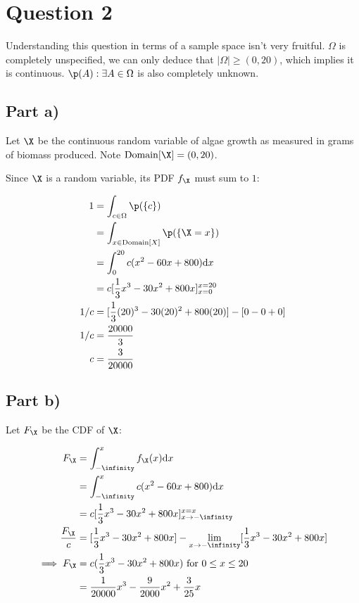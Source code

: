 \vspace{0.5cm}

\section{Question 2}

Understanding this question in terms of a sample space isn't very fruitful.
$\Omega$ is completely unspecified, we can only deduce that $|\Omega| \geq (0, 20)$, which implies it is continuous.
$\p (A) : \exists A \in \Omega$ is also completely unknown.

\subsection{Part a)}

Let $\X$ be the continuous random variable of algae growth as measured in grams of biomass produced.
Note $\mathrm{Domain}[\X] = (0, 20)$.

Since $\X$ is a random variable, its PDF $f_{\X}$ must sum to $1$:

\begin{align}
1 &= \int _{c \in \Omega} \p (\{ c \}) \\
&= \int _{x \in \mathrm{Domain}[X]} \p(\{ \X = x \}) \\
&= \int _0 ^{20} c(x^2 - 60x + 800) \mathrm{d}x \\
&= c[\frac{1}{3}x^3 - 30x^2 + 800x]_{x = 0}^{x=20} \\
1/c &= [\frac{1}{3}(20)^3 - 30(20)^2 + 800(20)] - [0 - 0 + 0] \\
1/c &= \frac{20000}{3} \\
c &= \frac{3}{20000}
\end{align}

\subsection{Part b)}

Let $F_{\X}$ be the CDF of $\X$:

\begin{align}
F_{\X} &= \int _{-\infinity} ^{x} f_{\X}(x) \mathrm{d}x \\
&= \int _{-\infinity} ^{x} c(x^2 - 60x + 800) \mathrm{d}x \\
&= c [\frac{1}{3}x^3 - 30x^2 + 800x]_{x \to -\infinity}^{x = x} \\
\frac{F_{\X}}{c} &= [\frac{1}{3} x^3 - 30x^2 + 800x] - \lim_{x \to -\infinity} [\frac{1}{3} x^3 - 30x^2 + 800x] \\
\implies F_{\X} &= c(\frac{1}{3} x^3 - 30x^2 + 800x) \text{ for } 0 \leq x \leq 20 \\
&= \frac{1}{20000}x^3 - \frac{9}{2000}x^2 + \frac{3}{25}x
\end{align}

\vspace{0.5cm}
